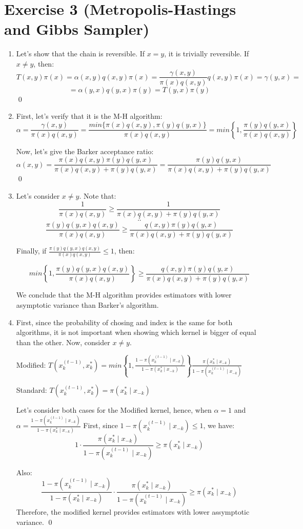 \documentclass[12pt,letterpaper]{article}
\begin{document}
\section*{Exercise 3 (Metropolis-Hastings and Gibbs Sampler)}
\begin{enumerate}[leftmargin=!,labelindent=5pt]
\item  Let's show that the chain is reversible. If $x=y$, it is trivially
reversible. If $x \neq y$, then:
$$
T(x,y) \pi(x) = \alpha(x,y)q(x,y)\pi(x) =
\frac{\gamma(x,y)}{\pi(x)q(x,y)}q(x,y)\pi(x) = \gamma(y,x) =
$$
$$
= \alpha(y,x) q(y,x) \pi(y) = T(y,x) \pi(y)
$$
\qed

\item First, let's verify that it is the M-H algorithm:
$$
\alpha = \frac{\gamma(x,y)}{\pi(x)q(x,y)} = 
\frac{min \{  \pi(x) q(x,y), \pi(y) q(y,x) \}}
{\pi(x) q(x,y)} =
min \left \{
	1, \frac{\pi(y)q(y,x)}
	{\pi(x)q(x,y)}
\right\}
$$

Now, let's give the Barker acceptance ratio:
$$
\alpha(x,y) = \frac{\pi(x)q(x,y)\pi(y)q(y,x)}
{\pi(x)q(x,y)+\pi(y)q(y,x)} =
\frac{\pi(y)q(y,x)}{\pi(x)q(x,y) + \pi(y)q(y,x)}
$$
\qed

\item Let's consider $x \neq y$. Note that:
$$
\frac{1}{\pi(x)q(x,y)}
\geq
\frac{1}{\pi(x)q(x,y) + \pi(y)q(y,x)}
$$
$$
\therefore
$$
$$
\frac{\pi(y)q(y,x)q(x,y)}{\pi(x)q(x,y)}
\geq
\frac{q(x,y)\pi(y)q(y,x)}{\pi(x)q(x,y) + \pi(y)q(y,x)}
$$

Finally, if $\frac{\pi(y)q(y,x)q(x,y)}{\pi(x)q(x,y)} \leq 1$, then:

$$
min\left \{
1,
\frac{\pi(y)q(y,x)q(x,y)}{\pi(x)q(x,y)}
\right\}
\geq
\frac{q(x,y)\pi(y)q(y,x)}{\pi(x)q(x,y) + \pi(y)q(y,x)}
$$

We conclude that the M-H algorithm provides estimators with
lower asymptotic variance than Barker's algorithm.

\item First, since the probability of chosing and index is the same
for both algorithms, it is not important when showing which
kernel is bigger of equal than the other. Now, consider $x \neq y$.

Modified: $T(x_k^{(t-1)}, x_k^*) =
min\left\{
1, \frac{1- \pi(x_k^{(t-1)} \mid x_{-k})}{1 -  \pi(x_k^* \mid x_{-k})}
\right\}
\frac{\pi(x_k^* \mid x_{-k})}{1- \pi(x_k^{(t-1)} \mid x_{-k})}$

Standard: $T(x_k^{(t-1)}, x_k^*) = \pi(x_k^* \mid x_{-k})$

Let's consider both cases for the Modified kernel, hence, when
$\alpha = 1$ and
$\alpha =
\frac{1- \pi(x_k^{(t-1)} \mid x_{-k})}{1 -  \pi(x_k^* \mid x_{-k})} $
First, since $1- \pi(x_k^{(t-1)} \mid x_{-k})\leq 1$, we have:
$$
1 \cdot\frac{\pi(x_k^* \mid x_{-k})}{1- \pi(x_k^{(t-1)} \mid x_{-k})}
\geq
\pi(x_k^* \mid x_{-k})
$$

Also:
$$
\frac{1- \pi(x_k^{(t-1)} \mid x_{-k})}{1 -  \pi(x_k^* \mid x_{-k})}
\cdot\frac{\pi(x_k^* \mid x_{-k})}{1- \pi(x_k^{(t-1)} \mid x_{-k})}
\geq
\pi(x_k^* \mid x_{-k})
$$
Therefore, the modified kernel provides estimators
with lower assymptotic variance.
\qed

\end{enumerate}
\end{document}
